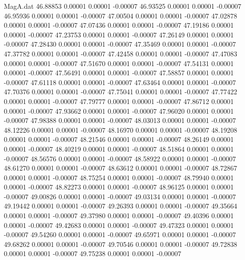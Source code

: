 \begin{filecontents}{MagA.dat}
  46.88853    0.00001    0.00001   -0.00007
  46.93525    0.00001    0.00001   -0.00007
  46.95936    0.00001    0.00001   -0.00007
  47.00504    0.00001    0.00001   -0.00007
  47.02878    0.00001    0.00001   -0.00007
  47.07436    0.00001    0.00001   -0.00007
  47.19186    0.00001    0.00001   -0.00007
  47.23753    0.00001    0.00001   -0.00007
  47.26149    0.00001    0.00001   -0.00007
  47.28430    0.00001    0.00001   -0.00007
  47.35469    0.00001    0.00001   -0.00007
  47.37782    0.00001    0.00001   -0.00007
  47.42458    0.00001    0.00001   -0.00007
  47.47083    0.00001    0.00001   -0.00007
  47.51670    0.00001    0.00001   -0.00007
  47.54131    0.00001    0.00001   -0.00007
  47.56491    0.00001    0.00001   -0.00007
  47.58857    0.00001    0.00001   -0.00007
  47.61118    0.00001    0.00001   -0.00007
  47.63464    0.00001    0.00001   -0.00007
  47.70376    0.00001    0.00001   -0.00007
  47.75041    0.00001    0.00001   -0.00007
  47.77422    0.00001    0.00001   -0.00007
  47.79777    0.00001    0.00001   -0.00007
  47.86712    0.00001    0.00001   -0.00007
  47.93662    0.00001    0.00001   -0.00007
  47.96020    0.00001    0.00001   -0.00007
  47.98388    0.00001    0.00001   -0.00007
  48.03013    0.00001    0.00001   -0.00007
  48.12226    0.00001    0.00001   -0.00007
  48.16970    0.00001    0.00001   -0.00007
  48.19208    0.00001    0.00001   -0.00007
  48.21546    0.00001    0.00001   -0.00007
  48.26149    0.00001    0.00001   -0.00007
  48.40219    0.00001    0.00001   -0.00007
  48.51864    0.00001    0.00001   -0.00007
  48.56576    0.00001    0.00001   -0.00007
  48.58922    0.00001    0.00001   -0.00007
  48.61270    0.00001    0.00001   -0.00007
  48.63612    0.00001    0.00001   -0.00007
  48.72867    0.00001    0.00001   -0.00007
  48.75254    0.00001    0.00001   -0.00007
  48.79940    0.00001    0.00001   -0.00007
  48.82273    0.00001    0.00001   -0.00007
  48.96125    0.00001    0.00001   -0.00007
  49.00826    0.00001    0.00001   -0.00007
  49.03134    0.00001    0.00001   -0.00007
  49.19442    0.00001    0.00001   -0.00007
  49.26393    0.00001    0.00001   -0.00007
  49.35664    0.00001    0.00001   -0.00007
  49.37980    0.00001    0.00001   -0.00007
  49.40396    0.00001    0.00001   -0.00007
  49.42683    0.00001    0.00001   -0.00007
  49.47323    0.00001    0.00001   -0.00007
  49.54260    0.00001    0.00001   -0.00007
  49.65971    0.00001    0.00001   -0.00007
  49.68262    0.00001    0.00001   -0.00007
  49.70546    0.00001    0.00001   -0.00007
  49.72838    0.00001    0.00001   -0.00007
  49.75238    0.00001    0.00001   -0.00007

\end{filecontents}
